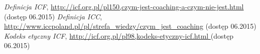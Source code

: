 \begin{thebibliography}{99}

 \textit{Definicja ICF}, \url{http://icf.org.pl/pl150,czym-jest-coaching-a-czym-nie-jest.html} (dostęp 06.2015)
 \textit{Definicja ICC}, \url{http://www.iccpoland.pl/pl/strefa_wiedzy/czym_jest_coaching} (dostęp 06.2015)
 \textit{Kodeks etyczny ICF}, \url{ http://icf.org.pl/pl98,kodeks-etyczny-icf.html } (dostęp 06.2015)
\end{thebibliography}
